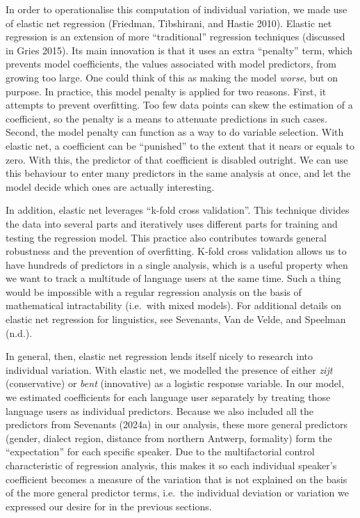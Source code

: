 \documentclass[
  letterpaper,
  DIV=11,
  numbers=noendperiod,
  oneside]{scrartcl}
\begin{document}
In order to operationalise this computation of individual variation, we
made use of elastic net regression (Friedman, Tibshirani, and Hastie
2010). Elastic net regression is an extension of more ``traditional''
regression techniques (discussed in Gries 2015). Its main innovation is
that it uses an extra ``penalty'' term, which prevents model
coefficients, the values associated with model predictors, from growing
too large. One could think of this as making the model \emph{worse}, but
on purpose. In practice, this model penalty is applied for two reasons.
First, it attempts to prevent overfitting. Too few data points can skew
the estimation of a coefficient, so the penalty is a means to attenuate
predictions in such cases. Second, the model penalty can function as a
way to do variable selection. With elastic net, a coefficient can be
``punished'' to the extent that it nears or equals to zero. With this,
the predictor of that coefficient is disabled outright. We can use this
behaviour to enter many predictors in the same analysis at once, and let
the model decide which ones are actually interesting.

In addition, elastic net leverages ``k-fold cross validation''. This
technique divides the data into several parts and iteratively uses
different parts for training and testing the regression model. This
practice also contributes towards general robustness and the prevention
of overfitting. K-fold cross validation allows us to have hundreds of
predictors in a single analysis, which is a useful property when we want
to track a multitude of language users at the same time. Such a thing
would be impossible with a regular regression analysis on the basis of
mathematical intractability (i.e.~with mixed models). For additional
details on elastic net regression for linguistics, see Sevenants, Van de
Velde, and Speelman (n.d.).

In general, then, elastic net regression lends itself nicely to research
into individual variation. With elastic net, we modelled the presence of
either \emph{zijt} (conservative) or \emph{bent} (innovative) as a
logistic response variable. In our model, we estimated coefficients for
each language user separately by treating those language users as
individual predictors. Because we also included all the predictors from
Sevenants (2024a) in our analysis, these more general predictors
(gender, dialect region, distance from northern Antwerp, formality) form
the ``expectation'' for each specific speaker. Due to the multifactorial
control characteristic of regression analysis, this makes it so each
individual speaker's coefficient becomes a measure of the variation that
is not explained on the basis of the more general predictor terms,
i.e.~the individual deviation or variation we expressed our desire for
in the previous sections.
\end{document}
